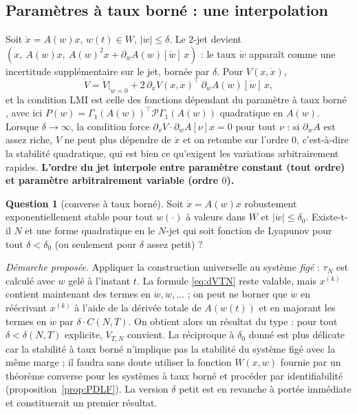 \documentclass[11pt,a4paper]{article}
\theoremstyle{definition}
\newtheorem{question}{Question}
\theoremstyle{remark}
\newcommand{\tr}{^{\top}}
\begin{document}
\subsection{Paramètres à taux borné : une interpolation}
Soit $\dot x = A(w)x$, $w(t)\in W$, $|\dot w|\le\delta$. Le $2$-jet devient $(x,\ A(w)x,\ A(w)^2x + \partial_wA(w)[\dot w]\,x)$ : le taux $\dot w$ apparaît comme une incertitude supplémentaire sur le jet, bornée par $\delta$. Pour $V(x,\dot x)$,
\[
\dot V = \dot V\big|_{\dot w=0} + 2\,\partial_{\dot x}V(x,\dot x)\tr\,\partial_wA(w)[\dot w]\,x,
\]
et la condition LMI est celle des fonctions dépendant du paramètre à taux borné \cite{GAC}, avec ici $P(w) = \Gamma_1(A(w))\tr\mathcal P\Gamma_1(A(w))$ quadratique en $A(w)$. Lorsque $\delta\to\infty$, la condition force $\partial_{\dot x}V\cdot\partial_wA[\nu]x=0$ pour tout $\nu$ : si $\partial_wA$ est assez riche, $V$ ne peut plus dépendre de $\dot x$ et on retombe sur l'ordre $0$, c'est-à-dire la stabilité quadratique, qui est bien ce qu'exigent les variations arbitrairement rapides. \textbf{L'ordre du jet interpole entre paramètre constant (tout ordre) et paramètre arbitrairement variable (ordre $0$).}

\begin{question}[converse à taux borné]\label{q:rate}
Soit $\dot x = A(w)x$ robustement exponentiellement stable pour tout $w(\cdot)$ à valeurs dans $W$ et $|\dot w|\le\delta_0$. Existe-t-il $N$ et une forme quadratique en le $N$-jet qui soit fonction de Lyapunov pour tout $\delta<\delta_0$ (ou seulement pour $\delta$ assez petit) ?
\end{question}
\noindent\emph{Démarche proposée.} Appliquer la construction universelle au système \emph{figé} : $\tau_N$ est calculé avec $w$ gelé à l'instant $t$. La formule \eqref{eq:dVTN} reste valable, mais $x^{(k)}$ contient maintenant des termes en $\dot w,\ddot w,\dots$ ; on peut ne borner que $\dot w$ en réécrivant $x^{(k)}$ à l'aide de la dérivée totale de $A(w(t))$ et en majorant les termes en $\dot w$ par $\delta\cdot C(N,T)$. On obtient alors un résultat du type : pour tout $\delta<\delta(N,T)$ explicite, $V_{T,N}$ convient. La réciproque à $\delta_0$ donné est plus délicate car la stabilité à taux borné n'implique pas la stabilité du système figé avec la même marge ; il faudra sans doute utiliser la fonction $W(x,w)$ fournie par un théorème converse pour les systèmes à taux borné et procéder par identifiabilité (proposition~\ref{prop:PDLF}). La version $\delta$ petit est en revanche à portée immédiate et constituerait un premier résultat.
\end{document}
